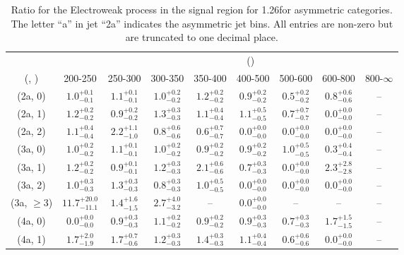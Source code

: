 \begin{table}[h!]
\tiny
\centering
\caption{Ratio for the Electroweak process in the signal region for 1.26\ifb for asymmetric categories. The letter ``a'' in jet \eg ``2a''  indicates the asymmetric jet bins. All entries are non-zero but are truncated to one decimal place.\label{tab:ratiosep_sig_ewk_asym}}
\begin{tabular}
{ccccccccc}
	\hline\hline
&	& \multicolumn{8}{c}{\scalht (\gev)} \\ 
	 (\njet,  \nb) & 200-250 & 250-300 & 300-350 & 350-400 & 400-500 & 500-600 & 600-800 & 800-$\infty$ \\ [0.8ex] 
\hline
	(2a, 0) & $1.0^{+ 0.1 }_{- 0.1 }$ & $1.1^{+ 0.1 }_{- 0.1 }$ & $1.0^{+ 0.2 }_{- 0.2 }$ & $1.2^{+ 0.2 }_{- 0.2 }$ & $0.9^{+ 0.2 }_{- 0.2 }$ & $0.5^{+ 0.2 }_{- 0.2 }$ & $0.8^{+ 0.6 }_{- 0.6 }$ & -- \\[0.5ex] 
	(2a, 1) & $1.2^{+ 0.2 }_{- 0.2 }$ & $0.9^{+ 0.2 }_{- 0.2 }$ & $1.3^{+ 0.3 }_{- 0.3 }$ & $1.1^{+ 0.4 }_{- 0.4 }$ & $1.1^{+ 0.5 }_{- 0.5 }$ & $0.7^{+ 0.7 }_{- 0.7 }$ & $0.0^{+ 0.0 }_{- 0.0 }$ & -- \\[0.5ex] 
	(2a, 2) & $1.1^{+ 0.4 }_{- 0.4 }$ & $2.2^{+ 1.1 }_{- 1.0 }$ & $0.8^{+ 0.6 }_{- 0.6 }$ & $0.6^{+ 0.7 }_{- 0.7 }$ & $0.0^{+ 0.0 }_{- 0.0 }$ & $0.0^{+ 0.0 }_{- 0.0 }$ & $0.0^{+ 0.0 }_{- 0.0 }$ & -- \\[0.5ex] 
	(3a, 0) & $1.0^{+ 0.2 }_{- 0.2 }$ & $1.1^{+ 0.1 }_{- 0.1 }$ & $1.0^{+ 0.2 }_{- 0.2 }$ & $0.9^{+ 0.2 }_{- 0.2 }$ & $0.9^{+ 0.2 }_{- 0.2 }$ & $1.0^{+ 0.5 }_{- 0.5 }$ & $0.3^{+ 0.4 }_{- 0.4 }$ & -- \\[0.5ex] 
	(3a, 1) & $1.2^{+ 0.2 }_{- 0.2 }$ & $0.9^{+ 0.1 }_{- 0.1 }$ & $1.2^{+ 0.3 }_{- 0.3 }$ & $2.1^{+ 0.6 }_{- 0.6 }$ & $0.7^{+ 0.3 }_{- 0.3 }$ & $0.0^{+ 0.0 }_{- 0.0 }$ & $2.3^{+ 2.8 }_{- 2.8 }$ & -- \\[0.5ex] 
	(3a, 2) & $1.0^{+ 0.3 }_{- 0.3 }$ & $1.3^{+ 0.3 }_{- 0.3 }$ & $0.8^{+ 0.3 }_{- 0.3 }$ & $1.0^{+ 0.5 }_{- 0.5 }$ & $0.0^{+ 0.0 }_{- 0.0 }$ & $0.0^{+ 0.0 }_{- 0.0 }$ & $0.0^{+ 0.0 }_{- 0.0 }$ & -- \\[0.5ex] 
	(3a, $\ge3$) & $11.7^{+ 20.0 }_{- 11.1 }$ & $1.4^{+ 1.6 }_{- 1.5 }$ & $2.7^{+ 4.0 }_{- 3.2 }$ & -- & $0.0^{+ 0.0 }_{- 0.0 }$ & -- & -- & -- \\[0.5ex] 
	(4a, 0) & $0.0^{+ 0.0 }_{- 0.0 }$ & $0.9^{+ 0.3 }_{- 0.3 }$ & $1.1^{+ 0.2 }_{- 0.2 }$ & $0.9^{+ 0.2 }_{- 0.2 }$ & $0.9^{+ 0.3 }_{- 0.3 }$ & $0.7^{+ 0.3 }_{- 0.3 }$ & $1.7^{+ 1.5 }_{- 1.5 }$ & -- \\[0.5ex] 
	(4a, 1) & $1.7^{+ 2.0 }_{- 1.9 }$ & $1.7^{+ 0.7 }_{- 0.6 }$ & $1.2^{+ 0.3 }_{- 0.3 }$ & $1.4^{+ 0.3 }_{- 0.3 }$ & $1.1^{+ 0.4 }_{- 0.4 }$ & $0.6^{+ 0.6 }_{- 0.6 }$ & $0.0^{+ 0.0 }_{- 0.0 }$ & -- \\[0.5ex] 

\end{tabular}
\end{table}
